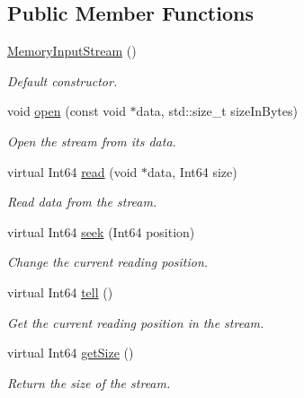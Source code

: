 \subsection*{Public Member Functions}
\begin{DoxyCompactItemize}
\item 
\mbox{\hyperlink{classsf_1_1_memory_input_stream_a2d78851a69a8956a79872be41bcdfe0e}{Memory\+Input\+Stream}} ()
\begin{DoxyCompactList}\small\item\em Default constructor. \end{DoxyCompactList}\item 
void \mbox{\hyperlink{classsf_1_1_memory_input_stream_ad3cfb4f4f915f7803d6a0784e394ac19}{open}} (const void $\ast$data, std\+::size\+\_\+t size\+In\+Bytes)
\begin{DoxyCompactList}\small\item\em Open the stream from its data. \end{DoxyCompactList}\item 
virtual Int64 \mbox{\hyperlink{classsf_1_1_memory_input_stream_adff5270c521819639154d42d76fd4c34}{read}} (void $\ast$data, Int64 size)
\begin{DoxyCompactList}\small\item\em Read data from the stream. \end{DoxyCompactList}\item 
virtual Int64 \mbox{\hyperlink{classsf_1_1_memory_input_stream_aa2ac8fda2bdb4c95248ae90c71633034}{seek}} (Int64 position)
\begin{DoxyCompactList}\small\item\em Change the current reading position. \end{DoxyCompactList}\item 
virtual Int64 \mbox{\hyperlink{classsf_1_1_memory_input_stream_a7ad4bdf721f29de8f66421ff29e23ee4}{tell}} ()
\begin{DoxyCompactList}\small\item\em Get the current reading position in the stream. \end{DoxyCompactList}\item 
virtual Int64 \mbox{\hyperlink{classsf_1_1_memory_input_stream_a6ade3ca45de361ffa0a718595f0b6763}{get\+Size}} ()
\begin{DoxyCompactList}\small\item\em Return the size of the stream. \end{DoxyCompactList}\end{DoxyCompactItemize}
